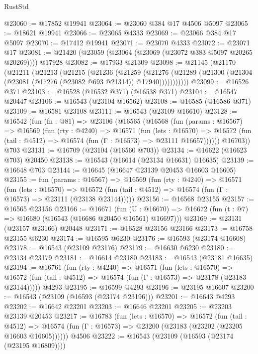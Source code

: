 \begin{lexlean}{RustStd}
\begin{coremodule}
@23060 := @17852 @19941
@23064 := @23060 @384 @17 @4506 @5097
@23065 := @18621 @19941
@23066 := @23065 @4333
@23069 := @23066 @384 @17 @5097
@23070 := @17412 @19941
@23071 := @23070 @4333
@23072 := @23071 @17
@23081 := @21420 (@23059 (@23064 (@23069 (@23072 @383 @5097 @20265 @20269)))) @17928
@23082 := @17933 @21309
@23098 := @21145
    (@21170
      (@21211
        (@21213
          (@21215
            (@21236
              (@21259
                (@21276
                  (@21289 (@21300 (@21304 (@23081 (@17276 (@23082 @693 @21314)) @17940)))))))))))
@23099 := @16526 @371
@23103 := @16528 (@16532 @371) (@16538 @371)
@23104 := @16547 @20447
@23106 := @16543 (@23104 @16562)
@23108 := @16585 (@16586 @371)
@23109 := @16581 @23108
@23111 := @16543 (@23109 @16610)
@23128 := @16542
    (fun (fn : @81) =>
    @23106
      (@16565
        (@16568
          (fun (params : @16567) =>
          @16569
            (fun (rty : @4240) =>
            @16571
              (fun (lets : @16570) =>
              @16572 (fun (tail : @4512) => @16574 (fun (Γ : @16573) => @23111 @16657))))))
        @16703))
    @703
@23131 := @16709 (@23104 (@16560 @703))
@23134 := @16622 (@16623 @703) @20450
@23138 := @16543 (@16614 (@23134 @16631) @16635)
@23139 := @16648 @703
@23144 := @16645 (@16647 @23139 @20453 @16603 @16605)
@23155 := fun (params : @16567) =>
  @16569
    (fun (rty : @4240) =>
    @16571
      (fun (lets : @16570) =>
      @16572 (fun (tail : @4512) => @16574 (fun (Γ : @16573) => @23111 (@23138 @23144)))))
@23156 := @16568 @23155
@23157 := @16565 @23156
@23166 := @16671
    (fun (U : @16670) => @16672 (fun (t : @7) => @16680 (@16543 (@16686 @20450 @16561) @16697)))
@23169 := @23131 (@23157 @23166) @20448
@23171 := @16528 @23156 @23166
@23173 := @16758 @23155 @6230
@23174 := @16595 @6230
@23176 := @16593 (@23174 @16608)
@23178 := @16543 (@23109 @23176)
@23179 := @16630 @6230
@23180 := @23134 @23179
@23181 := @16614 @23180
@23183 := @16543 (@23181 @16635)
@23194 := @16761
    (fun (rty : @4240) =>
    @16571
      (fun (lets : @16570) =>
      @16572 (fun (tail : @4512) => @16574 (fun (Γ : @16573) => @23178 (@23183 @23144)))))
    @4293
@23195 := @16599 @4293
@23196 := @23195 @16607
@23200 := @16543 (@23109 (@16593 (@23174 @23196)))
@23201 := @16643 @4293
@23202 := @16642 @23201
@23203 := @16646 @23201
@23205 := @23203 @23139 @20453
@23217 := @16783
    (fun (lets : @16570) =>
    @16572
      (fun (tail : @4512) =>
      @16574 (fun (Γ : @16573) => @23200 (@23183 (@23202 (@23205 @16603 @16605))))))
    @4506
@23222 := @16543 (@23109 (@16593 (@23174 (@23195 @16809))))

\end{coremodule}
\end{lexlean}
